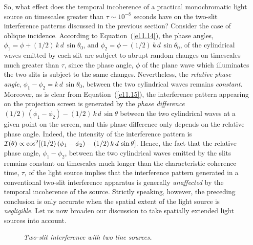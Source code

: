 So, what effect does the temporal incoherence of a practical monochromatic light source on timescales greater than $\tau\sim 10^{-8}$
seconds have on the two-slit interference patterns discussed in the previous section? Consider the case of oblique incidence.
According to Equation~(\ref{e11.14}), 
the phase angles, $\phi_1=\phi+(1/2)\,k\,d\,\sin\theta_0$, and $\phi_2=\phi-(1/2)\,k\,d\,\sin\theta_0$, of the
cylindrical waves emitted by each slit are subject to abrupt random changes on timescales much greater than $\tau$, since the
phase angle, $\phi$ of the plane wave which illuminates the two slits is subject to the same changes. Nevertheless, the
{\em relative phase angle}, $\phi_1-\phi_2= k\,d\,\sin\theta_0$,  between the two cylindrical waves remains {\em constant}. Moreover, 
as is clear from Equation~(\ref{e11.15}), the interference pattern appearing on the projection screen is generated by the {\em 
phase difference}\/ $(1/2)\,(\phi_1-\phi_2)-(1/2)\,k\,d\,\sin\theta$ between the two cylindrical waves at a given point on the screen,
and this phase difference only depends on the relative phase angle. Indeed, the
intensity of the interference pattern is ${\cal I}(\theta)\propto \cos^2[(1/2)\,(\phi_1-\phi_2)-(1/2)\,k\,d\,\sin\theta]$. 
 Hence, the
fact that the relative phase angle,  $\phi_1-\phi_2$, between the two cylindrical waves emitted by the slits remains constant on timescales much
longer than the characteristic coherence time, $\tau$, of the light source implies that the interference pattern generated in
a conventional two-slit interference apparatus
is generally {\em unaffected}\/ by the temporal incoherence of the source. Strictly speaking, however, the preceding 
conclusion is only accurate when the spatial extent of the light source is {\em negligible}. Let us now broaden
our discussion to take spatially extended light sources into account. 

\begin{figure}
\epsfysize=3.5in
\centerline{}
\caption{\em Two-slit interference with two line sources.}\label{f11.6}   
\end{figure}

